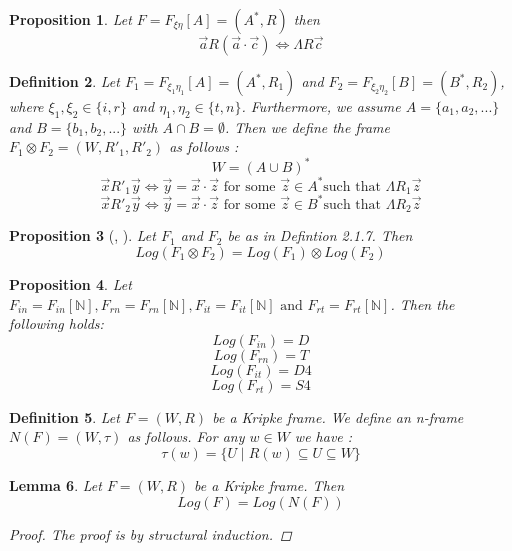 \documentclass[12pt, a4paper]{scrartcl}
\newtheorem{definition}{Definition}[subsection]
\newtheorem{lemma}[definition]{Lemma}
\newtheorem{proposition}[definition]{Proposition}
\begin{document}
\begin{proposition}
    Let $F =F_{\xi \eta}[A] = (A^*, R)$ then $$\vec{a}R(\vec{a} \cdot \vec{c}) \Leftrightarrow \Lambda R \vec{c}$$ 
\end{proposition}

\begin{definition}
    Let $F_1 = F_{\xi_1 \eta_1}[A] = (A^*,R_1)$ and $F_2 = F_{\xi_2 \eta_2}[B] = (B^*,R_2)$, where $\xi_1, \xi_2 \in \{i,r\}$ 
    and $\eta_1, \eta_2 \in \{t,n\}$. Furthermore, we assume $A = \{a_1, a_2,...\}$ and $B = \{b_1,b_2,...\}$ with $A \cap B = \emptyset$. Then we define the frame $F_1 \otimes F_2 = (W, R'_1, R'_2)$ as follows :
    $$W = (A \cup B)^*$$
    $$\vec{x} R'_1 \vec{y} \Leftrightarrow \vec{y} = \vec{x} \cdot \vec{z} \mbox{ for some } \vec{z} \in A^* \mbox{such that }\Lambda R_1 \vec{z}$$
    $$\vec{x} R'_2 \vec{y} \Leftrightarrow \vec{y} = \vec{x} \cdot \vec{z} \mbox{ for some } \vec{z} \in B^* \mbox{such that }\Lambda R_2 \vec{z}$$ \newline
\end{definition}

\begin{proposition} [\cite{ref6}, \cite{ref4}]
    Let $F_1$ and $F_2$ be as in Defintion 2.1.7. Then 
    $$Log(F_1 \otimes F_2) = Log(F_1) \otimes Log(F_2)$$
\end{proposition}

\begin{proposition}
    Let $F_{in} = F_{in}[\mathbb{N}], F_{rn} = F_{rn}[\mathbb{N}], F_{it} = F_{it}[\mathbb{N}] \mbox{ and } F_{rt} = F_{rt}[\mathbb{N}]$. Then the following holds: \newline 
    $$ Log(F_{in}) = D$$
    $$ Log(F_{rn}) = T$$
    $$ Log(F_{it}) = D4$$
    $$ Log(F_{rt}) = S4$$

\end{proposition}

\begin{definition}
    Let $F = (W,R)$ be a Kripke frame. We define an n-frame $N(F) = (W, \tau)$ as follows.
    For any $w\in W$ we have :
    $$\tau(w) = \{ U \mid R(w) \subseteq U \subseteq W \}$$
        
\end{definition}

\begin{lemma}

    Let $F = (W,R)$ be a Kripke frame. Then $$Log(F) = Log(N(F))$$ 
    \begin{proof}
        The proof is by structural induction.
    \end{proof}
\end{lemma}
\end{document}
